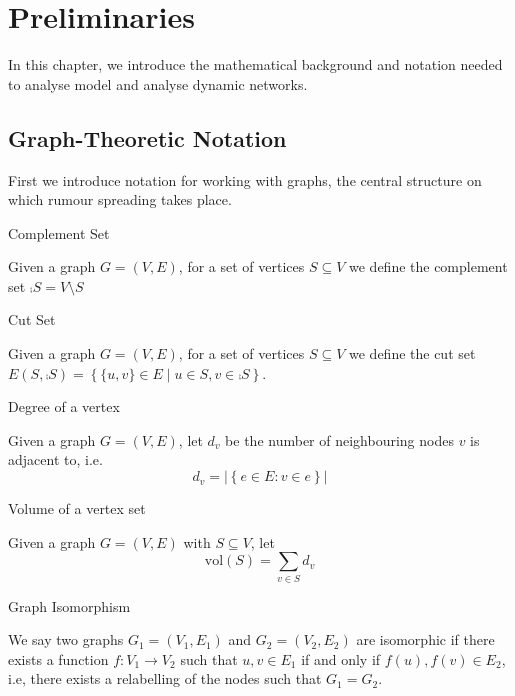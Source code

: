 \chapter{Preliminaries}
\label{chapter:Prelims}

In this chapter, we introduce the mathematical background and notation needed to analyse model and analyse dynamic networks.

\section{Graph-Theoretic Notation}

First we introduce notation for working with graphs, the central structure on which rumour spreading takes place.

\begin{definition}
	Complement Set

	\noindent
	Given a graph $G = (V, E)$, for a set of vertices $S \subseteq V$ we define the complement set $\comp{S} = V \setminus S$
\end{definition}

\begin{definition}
	Cut Set

	\noindent
	Given a graph $G = (V, E)$, for a set of vertices $S \subseteq V$ we define the cut set $ E(S, \comp{S}) = \left\{\{u, v\} \in E \mid u \in S, v \in \comp{S} \right\}.$
\end{definition}

\begin{definition}
	Degree of a vertex

	\noindent
	Given a graph $G = (V, E)$, let $d_v$ be the number of neighbouring nodes $v$ is adjacent to, i.e. $$
		d_v = |\left\{ e \in E : v \in e \right\}|
	$$
\end{definition}

\begin{definition}
	Volume of a vertex set

	\noindent
	Given a graph $G = (V, E)$ with $S \subseteq V$, let 
	$$
		\text{vol}(S) = \sum_{v \in S} d_v
	$$
\end{definition}

\begin{definition}
	Graph Isomorphism

	\noindent		
	We say two graphs $G_1 = (V_1, E_1)$ and $G_2 = (V_2, E_2)$ are isomorphic if there exists a function $f: V_1 \to V_2$ such that ${u, v} \in E_1$ if and only if ${f(u), f(v)} \in E_2$, i.e, there exists a relabelling of the nodes such that $G_1=G_2$.
\end{definition}

